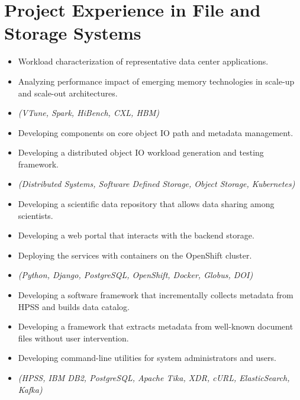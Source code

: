 \section{Project Experience in File and Storage Systems}

\begin{itemize}
    \item {Workload characterization of representative data center applications.}
    \item {Analyzing performance impact of emerging memory technologies in scale-up and scale-out architectures.}
    \item {\it\small(VTune, Spark, HiBench, CXL, HBM) }
\end{itemize}

\begin{itemize}
    \item {Developing components on core object IO path and metadata management.}
    \item {Developing a distributed object IO workload generation and testing framework.}
    \item {\it\small(Distributed Systems, Software Defined Storage, Object Storage, Kubernetes) }
\end{itemize}

\begin{itemize}
    \item {Developing a scientific data repository that allows data sharing among scientists.}
    \item {Developing a web portal that interacts with the backend storage.}
    \item {Deploying the services with containers on the OpenShift cluster.}
    \item {\it\small(Python, Django, PostgreSQL, OpenShift, Docker, Globus, DOI) }
\end{itemize}

\begin{itemize}
    \item {Developing a software framework that incrementally collects metadata from HPSS and builds data catalog.}
    \item {Developing a framework that extracts metadata from well-known document files without user intervention.}
    \item {Developing command-line utilities for system administrators and users.}
    \item {\it\small (HPSS, IBM DB2, PostgreSQL, Apache Tika, XDR, cURL, ElasticSearch, Kafka)}
\end{itemize}

